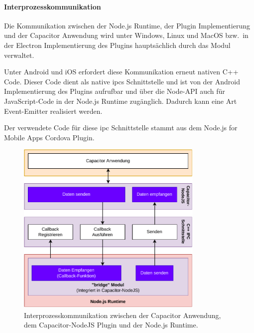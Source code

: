 \newpage

\paragraph{Interprozesskommunikation}

Die Kommunikation zwischen der Node.js Runtime, der Plugin Implementierung und der Capacitor Anwendung wird unter Windows, Linux und MacOS bzw.\ in der Electron Implementierung des Plugins hauptsächlich durch das  Modul verwaltet.
\cite{electron:docs}

Unter Android und iOS erfordert diese Kommunikation erneut nativen C++ Code.
Dieser Code dient als native \acp{ipc} Schnittstelle und ist von der Android Implementierung des Plugins aufrufbar und über die Node-API auch für JavaScript-Code in der Node.js Runtime zugänglich.
Dadurch kann eine Art Event-Emitter realisiert werden.
\cite{nodejs-mobile-cordova, nodejs}

Der verwendete Code für diese \ac{ipc} Schnittstelle stammt aus dem Node.js for Mobile Apps Cordova Plugin.
\cite{nodejs-mobile-cordova}

\vspace{1em}

\begin{figure}[H]
  \centering
  \includegraphics[width=0.8\textwidth]{assets/02_Capacitor-NodeJS/03_Interprozesskommunikation.drawio.pdf}
  \caption[Capacitor-NodeJS / Interprozesskommunikation]{Interprozesskommunikation zwischen der Capacitor Anwendung, dem Capacitor-NodeJS Plugin und der Node.js Runtime.}
\end{figure}

